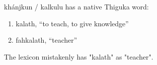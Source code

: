 \documentclass{thiguka}
\begin{document}
khánjkun / kalkulu has a native Thiguka word:

\begin{enumerate}
    \item kalath, ``to teach, to give knowledge''
    \item fahkalath, ``teacher''
\end{enumerate}
  
The lexicon mistakenly has "kalath" as "teacher".
\end{document}
